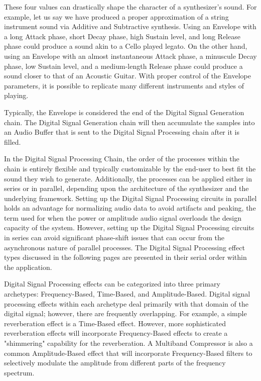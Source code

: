 \documentclass[a4paper,12pt]{report}
\begin{document}
These four values can drastically shape the character of a synthesizer's sound. For example, let us say we have produced a proper approximation of a string instrument sound via Additive and Subtractive synthesis. Using an Envelope with a long Attack phase, short Decay phase, high Sustain level, and long Release phase could produce a sound akin to a Cello played legato. On the other hand, using an Envelope with an almost instantaneous Attack phase, a minuscule Decay phase, low Sustain level, and a medium-length Release phase could produce a sound closer to that of an Acoustic Guitar. With proper control of the Envelope parameters, it is possible to replicate many different instruments and styles of playing.

Typically, the Envelope is considered the end of the Digital Signal Generation chain. The Digital Signal Generation chain will then accumulate the samples into an Audio Buffer that is sent to the Digital Signal Processing chain after it is filled.

In the Digital Signal Processing Chain, the order of the processes within the chain is entirely flexible and typically customizable by the end-user to best fit the sound they wish to generate. Additionally, the processes can be applied either in series or in parallel, depending upon the architecture of the synthesizer and the underlying framework. Setting up the Digital Signal Processing circuits in parallel holds an advantage for normalizing audio data to avoid artifacts and peaking, the term used for when the power or amplitude audio signal overloads the design capacity of the system. However, setting up the Digital Signal Processing circuits in series can avoid significant phase-shift issues that can occur from the asynchronous nature of parallel processes. The Digital Signal Processing effect types discussed in the following pages are presented in their serial order within the application.

Digital Signal Processing effects can be categorized into three primary archetypes: Frequency-Based, Time-Based, and Amplitude-Based. Digital signal processing effects within each archetype deal primarily with that domain of the digital signal; however, there are frequently overlapping. For example, a simple reverberation effect is a Time-Based effect. However, more sophisticated reverberation effects will incorporate Frequency-Based effects to create a "shimmering" capability for the reverberation. A Multiband Compressor is also a common Amplitude-Based effect that will incorporate Frequency-Based filters to selectively modulate the amplitude from different parts of the frequency spectrum.
\end{document}
